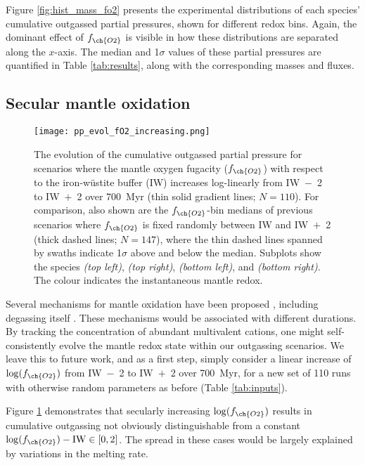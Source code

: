 \documentclass[3p,authoryear]{elsarticle}
\begin{document}
Figure \ref{fig:hist_mass_fo2} presents the experimental distributions of each species' cumulative outgassed partial pressures, shown for different redox bins. Again, the dominant effect of $f_{\ch{O2}}$ is visible in how these distributions are separated along the $x$-axis. The median and 1$\sigma$ values of these partial pressures are quantified in Table \ref{tab:results}, along with the corresponding masses and fluxes.  


\subsection{Secular mantle oxidation}


\begin{figure}
\centering\texttt{[image: pp\_evol\_fO2\_increasing.png]}
\caption{The evolution of the cumulative outgassed partial pressure for scenarios where the mantle oxygen fugacity ($f_{\ch{O2}}$) with respect to the iron-w\"ustite buffer (IW) increases log-linearly from IW~$-$~2 to IW~$+$~2 over 700~Myr (thin solid gradient lines; $N=110$). For comparison, also shown are the $f_{\ch{O2}}$-bin medians of previous scenarios where $f_{\ch{O2}}$ is fixed randomly between IW and IW~$+$~2 (thick dashed lines; $N=147$), where the thin dashed lines spanned by swaths indicate 1$\sigma$ above and below the median. Subplots show the species  \textit{(top left)},  \textit{(top right)},  \textit{(bottom left)}, and  \textit{(bottom right)}. The colour indicates the instantaneous mantle redox. \label{fig:evol_fo2increase}}
\end{figure}


Several mechanisms for mantle oxidation have been proposed \citep[e.g.,][]{Wood2006, Sharp2013, Gaillard2014, Wordsworth2018,  Schaefer2018, NICKLAS2019}, including degassing itself \citep{Kasting1993}. These mechanisms would be associated with different durations. By tracking the concentration of abundant multivalent cations, one might self-consistently evolve the mantle redox state within our outgassing scenarios. We leave this to future work, and as a first step, simply consider a linear increase of $\log (f_{\ch{O2}})$ from IW~$-$~2 to IW~$+$~2 over 700~Myr, for a new set of 110 runs with otherwise random parameters as before (Table \ref{tab:inputs}). 

Figure \ref{fig:evol_fo2increase} demonstrates that secularly increasing $\log (f_{\ch{O2}})$ results in cumulative outgassing not obviously distinguishable from a constant $\log (f_{\ch{O2}}) - {\rm IW} \in [0, 2]$. The spread in these cases would be largely explained by variations in the melting rate.
\end{document}
